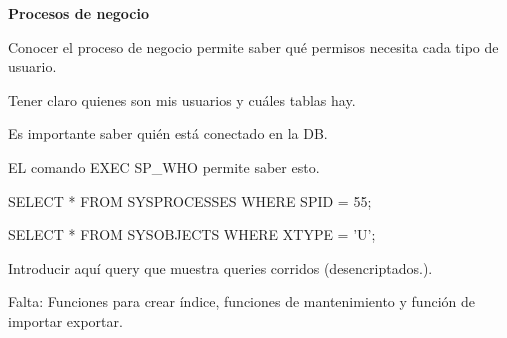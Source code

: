 \documentclass{article}
\begin{document}
\textbf{Procesos de negocio}
\vspace{1em}

Conocer el proceso de negocio permite saber qué permisos necesita cada tipo de
usuario.

Tener claro quienes son mis usuarios y cuáles tablas hay.
\vspace{1em}

Es importante saber quién está conectado en la DB.

EL comando EXEC SP\_WHO permite saber esto.

SELECT * FROM SYSPROCESSES WHERE SPID = 55;

SELECT * FROM SYSOBJECTS WHERE XTYPE = 'U';

Introducir aquí query que muestra queries corridos (desencriptados.).
\vspace{1em}

Falta: Funciones para crear índice, funciones de mantenimiento y función de
importar exportar.
\end{document}
